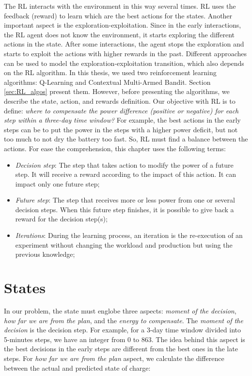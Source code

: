 The RL interacts with the environment in this way several times. RL uses the feedback (reward) to learn which are the best actions for the states. Another important aspect is the exploration-exploitation. Since in the early interactions, the RL agent does not know the environment, it starts exploring the different actions in the state. After some interactions, the agent stops the exploration and starts to exploit the actions with higher rewards in the past. Different approaches can be used to model the exploration-exploitation transition, which also depends on the RL algorithm. In this thesis, we used two reinforcement learning algorithms: Q-Learning and Contextual Multi-Armed Bandit. Section \ref{sec:RL_algos} present them. However, before presenting the algorithms, we describe the state, action, and rewards definition. Our objective with RL is to define: \textit{where to compensate the power difference (positive or negative) for each step within a three-day time window?} For example, the best actions in the early steps can be to put the power in the steps with a higher power deficit, but not too much to not dry the battery too fast. So, RL must find a balance between the actions. For ease the comprehension, this chapter uses the following terms:
\begin{itemize}
    \item \textit{Decision step}: The step that takes action to modify the power of a future step. It will receive a reward according to the impact of this action. It can impact only one future step;
    \item \textit{Future step}: The step that receives more or less power from one or several decision steps. When this future step finishes, it is possible to give back a reward for the decision step(s);
    \item \textit{Iterations}: During the learning process, an iteration is the re-execution of an experiment without changing the workload and production but using the previous knowledge;
\end{itemize}

\section{States}

In our problem, the state must englobe three aspects: \textit{moment of the decision}, \textit{how far we are from the plan}, and the \textit{energy to compensate}. The \textit{moment of the decision} is the decision step. For example, for a 3-day time window divided into 5-minutes steps, we have an integer from 0 to 863. The idea behind this aspect is the best decisions in the early steps are different from the best ones in the late steps. For \textit{how far we are from the plan} aspect, we calculate the difference between the actual and predicted state of charge:

